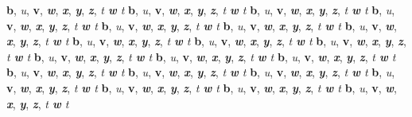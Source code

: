 \textbf{b}, \emph{u}, \textbf{v}, \emph{\textbf{w}}, \emph{\textbf{x}}, \textbf{\emph{y}}, \textbf{\emph{z}}, \emph{t \textbf{w} t}
\textbf{b}, \emph{u}, \textbf{v}, \emph{\textbf{w}}, \emph{\textbf{x}}, \textbf{\emph{y}}, \textbf{\emph{z}}, \emph{t \textbf{w} t}
\textbf{b}, \emph{u}, \textbf{v}, \emph{\textbf{w}}, \emph{\textbf{x}}, \textbf{\emph{y}}, \textbf{\emph{z}}, \emph{t \textbf{w} t}
\textbf{b}, \emph{u}, \textbf{v}, \emph{\textbf{w}}, \emph{\textbf{x}}, \textbf{\emph{y}}, \textbf{\emph{z}}, \emph{t \textbf{w} t}
\textbf{b}, \emph{u}, \textbf{v}, \emph{\textbf{w}}, \emph{\textbf{x}}, \textbf{\emph{y}}, \textbf{\emph{z}}, \emph{t \textbf{w} t}
\textbf{b}, \emph{u}, \textbf{v}, \emph{\textbf{w}}, \emph{\textbf{x}}, \textbf{\emph{y}}, \textbf{\emph{z}}, \emph{t \textbf{w} t}
\textbf{b}, \emph{u}, \textbf{v}, \emph{\textbf{w}}, \emph{\textbf{x}}, \textbf{\emph{y}}, \textbf{\emph{z}}, \emph{t \textbf{w} t}
\textbf{b}, \emph{u}, \textbf{v}, \emph{\textbf{w}}, \emph{\textbf{x}}, \textbf{\emph{y}}, \textbf{\emph{z}}, \emph{t \textbf{w} t}
\textbf{b}, \emph{u}, \textbf{v}, \emph{\textbf{w}}, \emph{\textbf{x}}, \textbf{\emph{y}}, \textbf{\emph{z}}, \emph{t \textbf{w} t}
\textbf{b}, \emph{u}, \textbf{v}, \emph{\textbf{w}}, \emph{\textbf{x}}, \textbf{\emph{y}}, \textbf{\emph{z}}, \emph{t \textbf{w} t}
\textbf{b}, \emph{u}, \textbf{v}, \emph{\textbf{w}}, \emph{\textbf{x}}, \textbf{\emph{y}}, \textbf{\emph{z}}, \emph{t \textbf{w} t}
\textbf{b}, \emph{u}, \textbf{v}, \emph{\textbf{w}}, \emph{\textbf{x}}, \textbf{\emph{y}}, \textbf{\emph{z}}, \emph{t \textbf{w} t}
\textbf{b}, \emph{u}, \textbf{v}, \emph{\textbf{w}}, \emph{\textbf{x}}, \textbf{\emph{y}}, \textbf{\emph{z}}, \emph{t \textbf{w} t}
\textbf{b}, \emph{u}, \textbf{v}, \emph{\textbf{w}}, \emph{\textbf{x}}, \textbf{\emph{y}}, \textbf{\emph{z}}, \emph{t \textbf{w} t}
\textbf{b}, \emph{u}, \textbf{v}, \emph{\textbf{w}}, \emph{\textbf{x}}, \textbf{\emph{y}}, \textbf{\emph{z}}, \emph{t \textbf{w} t}
\textbf{b}, \emph{u}, \textbf{v}, \emph{\textbf{w}}, \emph{\textbf{x}}, \textbf{\emph{y}}, \textbf{\emph{z}}, \emph{t \textbf{w} t}
\textbf{b}, \emph{u}, \textbf{v}, \emph{\textbf{w}}, \emph{\textbf{x}}, \textbf{\emph{y}}, \textbf{\emph{z}}, \emph{t \textbf{w} t}
\textbf{b}, \emph{u}, \textbf{v}, \emph{\textbf{w}}, \emph{\textbf{x}}, \textbf{\emph{y}}, \textbf{\emph{z}}, \emph{t \textbf{w} t}
\textbf{b}, \emph{u}, \textbf{v}, \emph{\textbf{w}}, \emph{\textbf{x}}, \textbf{\emph{y}}, \textbf{\emph{z}}, \emph{t \textbf{w} t}
\textbf{b}, \emph{u}, \textbf{v}, \emph{\textbf{w}}, \emph{\textbf{x}}, \textbf{\emph{y}}, \textbf{\emph{z}}, \emph{t \textbf{w} t}
